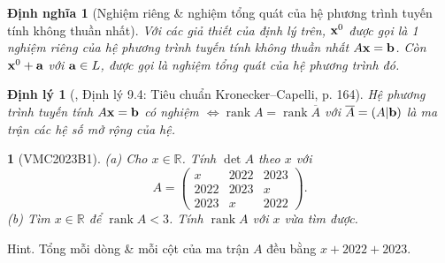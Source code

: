 \documentclass{article}
\newtheorem{baitoan}{}
\newtheorem{dinhly}{Định lý}
\newtheorem{dinhnghia}{Định nghĩa}
\begin{document}
\begin{dinhnghia}[Nghiệm riêng \& nghiệm tổng quát của hệ phương trình tuyến tính không thuần nhất]
	Với các giả thiết của định lý trên, ${\bf x}^0$ được gọi là 1 \emph{nghiệm riêng} của hệ phương trình tuyến tính không thuần nhất $A{\bf x} = {\bf b}$. Còn ${\bf x}^0 + {\bf a}$ với ${\bf a}\in L$, được gọi là \emph{nghiệm tổng quát} của hệ phương trình đó.
\end{dinhnghia}

\begin{dinhly}[\cite{Hung_linear_algebra}, Định lý 9.4: Tiêu chuẩn Kronecker--Capelli, p. 164]
	Hệ phương trình tuyến tính $A{\bf x} = {\bf b}$ có nghiệm $\Leftrightarrow\operatorname{rank}A = \operatorname{rank}\overline{A}$ với $\overline{A} = (A|{\bf b})$ là ma trận các hệ số mở rộng của hệ.
\end{dinhly}

\begin{baitoan}[VMC2023B1]
	(a) Cho $x\in\mathbb{R}$. Tính $\det A$ theo $x$ với
	\begin{equation*}
		A = \begin{pmatrix}
			x & 2022 & 2023\\2022 & 2023 & x\\2023 & x & 2022
		\end{pmatrix}.
	\end{equation*}
	(b) Tìm $x\in\mathbb{R}$ để $\operatorname{rank}A < 3$. Tính $\operatorname{rank}A$ với $x$ vừa tìm được.
\end{baitoan}
{\sf Hint.} Tổng mỗi dòng \& mỗi cột của ma trận $A$ đều bằng $x + 2022 + 2023$.
\end{document}
